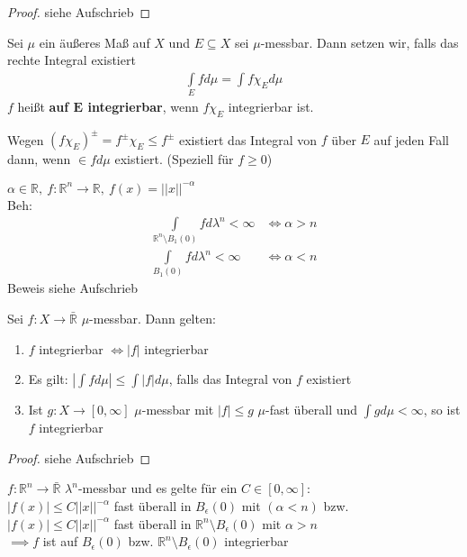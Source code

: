   \begin{proof}
    siehe Aufschrieb
  \end{proof}

  \begin{definition}
    Sei $\mu$ ein äußeres Maß auf $X$ und $E \subseteq X$ sei $\mu$-messbar. Dann setzen wir, falls das rechte Integral existiert
    \begin{align*}
      \int\limits_E f d\mu = \int f \chi_E d\mu
    \end{align*}
    $f$ heißt \textbf{auf $\bm{E}$ integrierbar}, wenn $f \chi_E$ integrierbar ist.
  \end{definition}

  \begin{remark}
    Wegen $(f \chi_E)^{\pm} = f^{\pm} \chi_E \leq f^{\pm}$ existiert das Integral von $f$ über $E$ auf jeden Fall dann, wenn $\in f d\mu$ existiert. (Speziell für $f \geq 0$)
  \end{remark}

  \begin{example}
    $\alpha \in \mathbb{R}, \ f:\mathbb{R}^n \to \mathbb{R}, \ f(x) = ||x||^{-\alpha}$\\
    Beh: 
    \begin{align*}
      \int\limits_{\mathbb{R}^n \setminus B_1(0)} f d\lambda^n < \infty &\Leftrightarrow \alpha > n\\
      \int\limits_{B_1(0)} f d\lambda^n < \infty &\Leftrightarrow \alpha < n
    \end{align*}
    Beweis siehe Aufschrieb
  \end{example}

  \newpage
  \begin{theorem}
    Sei $f: X \to \bar{\mathbb{R}}$ $\mu$-messbar. Dann gelten:
    \begin{enumerate}[label=\roman*)]
      \item $f$ integrierbar $\Leftrightarrow |f|$ integrierbar
      \item Es gilt: $|\int f d\mu| \leq \int |f| d\mu$, falls das Integral von $f$ existiert
      \item Ist $g: X \to [0, \infty]$ $\mu$-messbar mit $|f| \leq g$ $\mu$-fast überall und $\int g d\mu < \infty$, so ist $f$ integrierbar 
    \end{enumerate}
  \end{theorem}

  \begin{proof}
    siehe Aufschrieb
  \end{proof}

  \begin{example}
    $f: \mathbb{R}^n \to \bar{\mathbb{R}}$ $\lambda^n$-messbar und es gelte für ein $C \in [0, \infty]$:\\
    $|f(x)| \leq C ||x||^{-\alpha}$ fast überall in $B_{\epsilon}(0)$ mit $(\alpha < n)$ bzw.\\
    $|f(x)| \leq C ||x||^{-\alpha}$ fast überall in $\mathbb{R}^n \setminus B_{\epsilon}(0)$ mit $\alpha > n$\\
    $\implies f$ ist auf $B_{\epsilon}(0)$ bzw. $\mathbb{R}^n \setminus B_{\epsilon}(0)$ integrierbar
  \end{example}

  